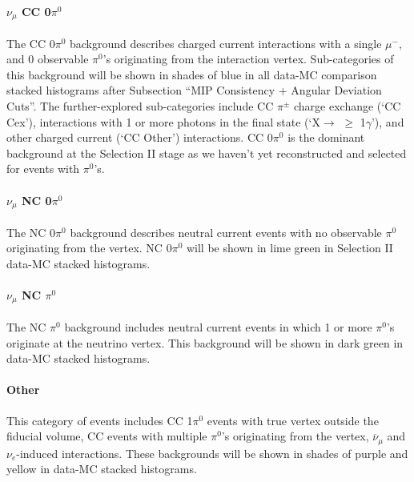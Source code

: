 \documentclass{article}
\begin{document}
\paragraph{ $\nu_\mu$ CC 0$\pi^0$}
The CC 0$\pi^0$ background describes charged current interactions with a single $\mu^-$, and 0 observable $\pi^0$'s originating from the interaction vertex. Sub-categories of this background will be shown in shades of blue in all data-MC comparison stacked histograms after Subsection ``MIP Consistency + Angular Deviation Cuts''. The further-explored sub-categories include CC $\pi^{\pm}$ charge exchange (`CC Cex'), interactions with 1 or more photons in the final state (`X$\rightarrow$ $\geq$ 1$\gamma$'), and other charged current (`CC Other') interactions. CC 0$\pi^0$ is the dominant background at the Selection II stage as we haven't yet reconstructed and selected for events with $\pi^0$'s.


\paragraph{  $\nu_\mu$ NC 0$\pi^0$}
The NC 0$\pi^0$ background describes neutral current events with no observable $\pi^0$ originating from the vertex.  NC 0$\pi^0$ will be shown in lime green in Selection II data-MC stacked histograms. 


\paragraph{  $\nu_\mu$ NC $\pi^0$}
The NC $\pi^0$ background includes neutral current events in which 1 or more $\pi^0$'s originate at the neutrino vertex.  This background will be shown in dark green in data-MC stacked histograms.


\paragraph{ Other}
This category of events includes CC 1$\pi^0$ events with true vertex outside the fiducial volume, CC events with multiple $\pi^0$'s originating from the vertex, $\overline{\nu}_\mu$ and $\nu_e$-induced interactions.  These backgrounds will be shown in shades of purple and yellow in data-MC stacked histograms.
\end{document}
